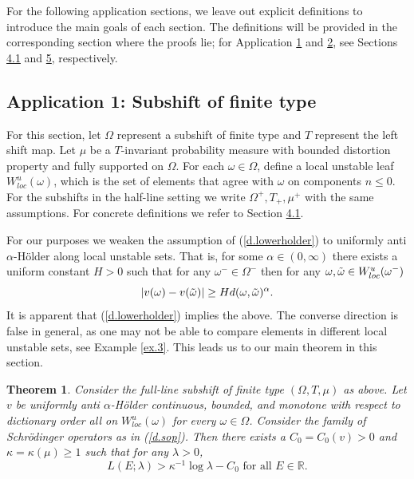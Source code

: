 \documentclass{amsart}
\newtheorem{theorem}{Theorem}
\newcommand{\RR}{\mathbb{R}}
\begin{document}
For the following application sections, we leave out explicit definitions to introduce the main goals of each section. The definitions will be provided in the corresponding section where the proofs lie; for Application \hyperlink{Application1}{1} and \hyperlink{Application2}{2}, see Sections \hyperlink{prelim}{4.1} and \hyperlink{OEDT}{5}, respectively.

\subsection{Application 1: Subshift of finite type} \hypertarget{Application1}{}

For this section, let $\Omega$ represent a subshift of finite type and $T$ represent the left shift map. Let $\mu$ be a $T$-invariant probability measure with bounded distortion property and fully supported on $\Omega$. For each $\omega\in \Omega$, define a local unstable leaf $W^u_{loc}(\omega)$, which is the set of elements that agree with $\omega$ on components $n\leq 0$. For the subshifts in the half-line setting we write $\Omega^+, T_+, \mu^+$ with the same assumptions. For concrete definitions we refer to Section \hyperlink{prelim}{4.1}.

For our purposes we weaken the assumption of (\ref{d.lowerholder}) to uniformly anti $\alpha$-H\"older along local unstable sets. That is, for some $\alpha\in (0,\infty)$ there exists a uniform constant $H>0$ such that for any $\omega^-\in \Omega^-$ then for any $\omega, \Tilde{\omega}\in W^u_{loc}(\omega^-)$ 
\[|v(\omega)- v(\Tilde{\omega})|\geq Hd(\omega,\Tilde{\omega})^\alpha.\]
It is apparent that (\ref{d.lowerholder}) implies the above. The converse direction is false in general, as one may not be able to compare elements in different local unstable sets, see Example \ref{ex.3}. This leads us to our main theorem in this section.

\begin{theorem}\label{t.fullPLE}
    Consider the full-line subshift of finite type $(\Omega, T,\mu)$ as above. Let $v$ be uniformly anti $\alpha$-H\"older continuous, bounded, and monotone with respect to dictionary order all on $W^u_{loc}(\omega)$ for every $\omega\in \Omega$. Consider the family of Schr\"odinger operators as in (\ref{d.sop}). Then there exists a $C_0 = C_0(v)>0$ and $\kappa = \kappa(\mu)\geq 1$ such that for any $\lambda> 0$,
    \[L(E;\lambda) > \kappa^{-1} \log\lambda - C_0 \text{ for all } E\in \RR.\]
\end{theorem}
\end{document}
